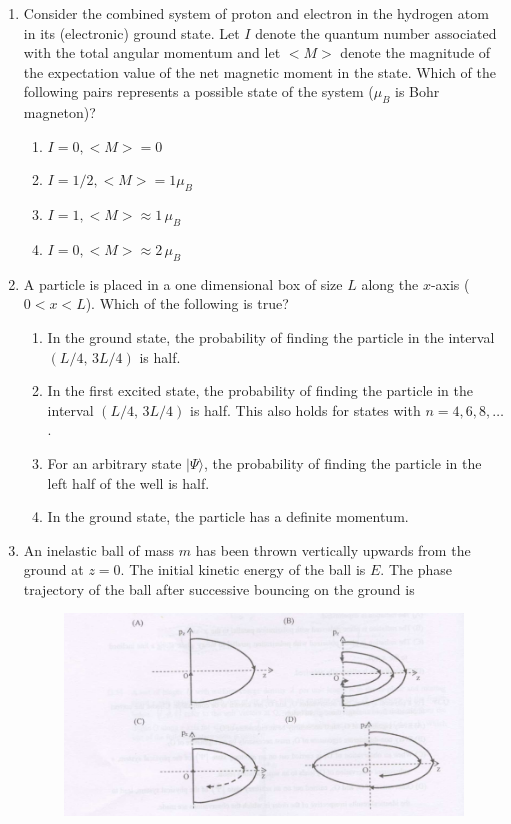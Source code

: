 \documentclass[journal,12pt,onecolumn]{IEEEtran}
\theoremstyle{remark}
\begin{document}
\begin{enumerate}
\item Consider the combined system of proton and electron in the hydrogen atom in its (electronic) ground state.  Let $I$ denote the quantum number associated with the total angular momentum and let $<M>$ denote the magnitude of the expectation value of the net magnetic moment in the state.  Which of the following pairs represents a possible state of the system ($\mu_B$ is Bohr magneton)?
\hfill{}
\begin{multicols}{2}
\begin{enumerate}
    \item $I = 0,<M> = 0$
    \item $I = {1}/{2},<M>= 1\mu_B$
    \item $I = 1,<M>\approx 1\,\mu_B$
    \item $I = 0,<M> \approx 2\,\mu_B$
\end{enumerate}
\end{multicols}
\item A particle is placed in a one dimensional box of size $L$ along the $x$-axis ($0<x<L$). Which of the following is true?
\hfill{}
\begin{enumerate}
    \item In the ground state, the probability of finding the particle in the interval $(L/4,\,3L/4)$ is half.
    \item In the first excited state, the probability of finding the particle in the interval $(L/4,\,3L/4)$ is half. This also holds for states with $n=4,6,8,\dots$.
    \item For an arbitrary state $|\Psi\rangle$, the probability of finding the particle in the left half of the well is half.
    \item In the ground state, the particle has a definite momentum.
\end{enumerate}


\item An inelastic ball of mass $m$ has been thrown vertically upwards from the ground at $z=0$. The initial kinetic energy of the ball is $E$. The phase trajectory of the ball after successive bouncing on the ground is
\hfill{}
\begin{figure}[H]
    \centering
    \includegraphics[width = 0.6\columnwidth]{fig/Q42..png}
    \caption*{}
    \label{fig:Q42}
\end{figure}



\end{enumerate}
\end{document}
